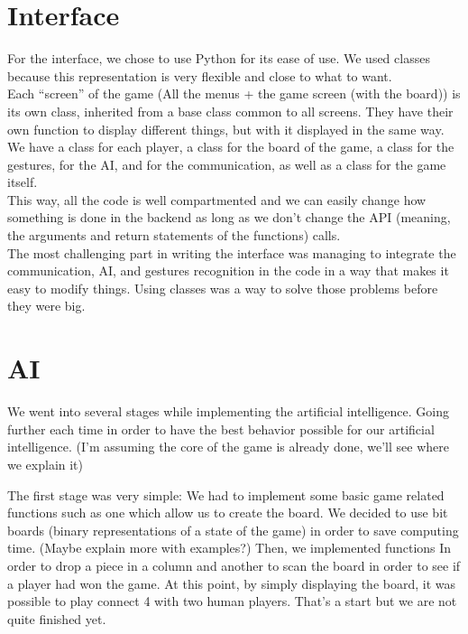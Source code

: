 \documentclass[12pt, a4paper, oneside]{report}
\begin{document}
	\section{Interface}
	For the interface, we chose to use Python for its ease of use. We used classes because this representation is very flexible and close to what to want. \\

	Each “screen” of the game (All the menus + the game screen (with the board)) is its own class, inherited from a base class common to all screens. They have their own function to display different things, but with it displayed in the same way. \\ %

	We have a class for each player, a class for the board of the game, a class for the gestures, for the AI, and for the communication, as well as a class for the game itself. \\
	This way, all the code is well compartmented and we can easily change how something is done in the backend as long as we don't change the API (meaning, the arguments and return statements of the functions) calls. \\

	The most challenging part in writing the interface was managing to integrate the communication, AI, and gestures recognition in the code in a way that makes it easy to modify things. Using classes was a way to solve those problems before they were big.

	\section{AI}\label{AI_section}

	We went into several stages while implementing the artificial intelligence. Going further each time in order to have the best behavior possible for our artificial intelligence. (I’m assuming the core of the game is already done, we’ll see where we explain it)


The first stage was very simple:
 	We had to implement some basic game related functions such as one which allow us to create the board. We decided to use bit boards (binary representations of a state of the game) in order to save computing time. (Maybe explain more with examples?)
	Then, we implemented functions In order to drop a piece in a column and another to scan the board in order to see if a player had won the game. At this point, by simply displaying the board, it was possible to play connect 4 with two human players. That’s a start but we are not quite finished yet.
\end{document}
